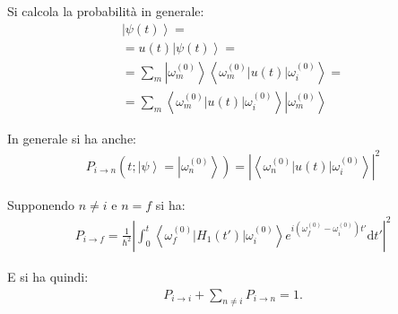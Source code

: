 Si calcola la probabilità in generale:
\begin{equation}\begin{split}
\left |\psi \left(t\right) \right\rangle=\\
=u\left(t\right)\left |\psi \left(t\right) \right\rangle=\\
=\sum_m{\left |\omega _m^{\left(0\right)} \right\rangle\left\langle \omega _{m}^{\left(0\right)}|u\left(t\right)|\omega _i^{\left(0\right)} \right\rangle}=\\
=\sum_m{\left\langle \omega _{m}^{\left(0\right)}|u\left(t\right)|\omega _i^{\left(0\right)} \right\rangle\left |\omega _m^{\left(0\right)} \right\rangle}
\end{split}\end{equation}

In generale si ha anche:
\begin{equation}\begin{split}
P_{i\to n}\left(t;\left |\psi  \right\rangle=\left |\omega _n^{\left(0\right)} \right\rangle\right)=\left|\left\langle \omega _{n}^{\left(0\right)}|u\left(t\right)|\omega _i^{\left(0\right)} \right\rangle\right|^2
\end{split}\end{equation}

Supponendo $n\neq i$ e $n=f$ si ha:
\begin{equation}\begin{split}
P_{i\to f}=\frac{1}{\hbar ^2}\left|\int_0^t{\left\langle \omega _{f}^{\left(0\right)}|H_1\left(t'\right)|\omega _i^{\left(0\right)} \right\rangle e^{i\left(\omega _f^{\left(0\right)}-\omega _i^{\left(0\right)}\right)t'}\textrm{d}t'} \right|^2
\end{split}\end{equation}


E si ha quindi:
\begin{equation}\begin{split}
P_{i\to i}+\sum_{n\neq i}{P_{i\to n}}=1.
\end{split}\end{equation}

